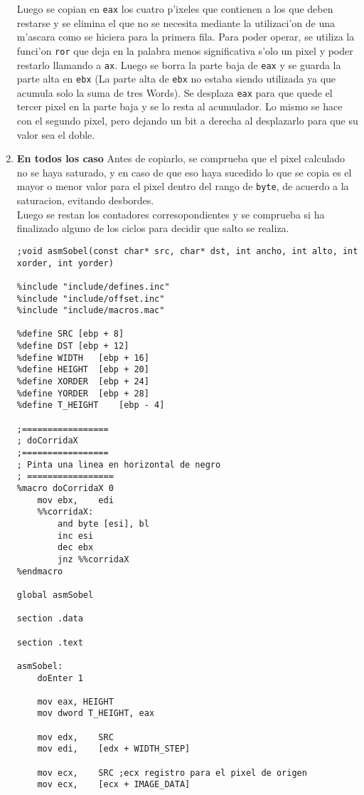 \documentclass[11pt]{article}
\begin{document}
\begin{enumerate}
Luego se copian en \verb'eax' los cuatro p'ixeles que contienen a los que deben restarse y se elimina el que no se necesita mediante la utilizaci'on de una m'ascara como se hiciera para la primera fila. Para poder operar, se utiliza la funci'on \verb'ror' que deja en la palabra menos significativa s'olo un pixel y poder restarlo llamando a \verb'ax'. Luego se borra la parte baja de \verb'eax' y se guarda la parte alta en \verb'ebx' (La parte alta de \verb'ebx' no estaba siendo utilizada ya que acumula solo la suma de tres Words). Se desplaza \verb'eax' para que quede el tercer pixel en la parte baja y se lo resta al acumulador. Lo mismo se hace con el segundo pixel, pero dejando un bit a derecha al desplazarlo para que su valor sea el doble.
\item \textbf{En todos los caso}
\subitem Antes de copiarlo, se comprueba que el pixel calculado no se haya saturado, y en caso de que eso haya sucedido lo que se copia es el mayor o menor valor para el pixel dentro del rango de \verb'byte', de acuerdo a la saturacion, evitando desbordes.\\
Luego se restan los contadores corresopondientes y se comprueba si ha finalizado alguno de los ciclos para decidir que salto se realiza.
\begin{lstlisting}[frame=single]
;void asmSobel(const char* src, char* dst, int ancho, int alto, int xorder, int yorder)

%include "include/defines.inc"
%include "include/offset.inc"
%include "include/macros.mac"

%define SRC	[ebp + 8]
%define DST	[ebp + 12]
%define WIDTH 	[ebp + 16]
%define HEIGHT	[ebp + 20]
%define XORDER	[ebp + 24]
%define YORDER	[ebp + 28]
%define T_HEIGHT	[ebp - 4]

;=================
; doCorridaX
;=================
; Pinta una linea en horizontal de negro
; =================
%macro doCorridaX 0
	mov ebx,	edi
	%%corridaX:
		and byte [esi], bl
		inc esi		
		dec ebx
		jnz %%corridaX
%endmacro

global asmSobel

section .data

section .text

asmSobel:
	doEnter 1

	mov eax, HEIGHT
	mov dword T_HEIGHT, eax

	mov	edx,	SRC
	mov	edi,	[edx + WIDTH_STEP]
	
	mov	ecx,	SRC	;ecx registro para el pixel de origen
	mov	ecx,	[ecx + IMAGE_DATA]


\end{lstlisting}
\end{enumerate}
\end{document}
